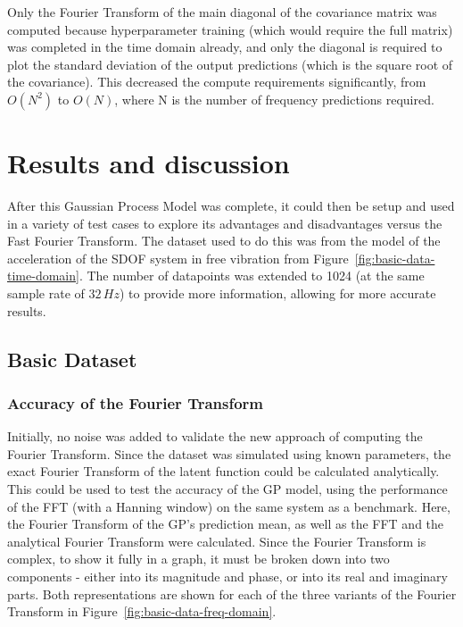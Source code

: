 \documentclass[12pt]{article}
\begin{document}

    Only the Fourier Transform of the main diagonal of the covariance matrix was computed because hyperparameter training (which would require the full matrix) was completed in the time domain already, and only the diagonal is required to plot the standard deviation of the output predictions (which is the square root of the covariance).
    This decreased the compute requirements significantly, from $O(N^2)$ to $O(N)$, where N is the number of frequency predictions required.



    \section{Results and discussion}
    After this Gaussian Process Model was complete, it could then be setup and used in a variety of test cases to explore its advantages and disadvantages versus the Fast Fourier Transform.
    The dataset used to do this was from the model of the acceleration of the SDOF system in free vibration from Figure~\ref{fig:basic-data-time-domain}.
    The number of datapoints was extended to 1024 (at the same sample rate of $32 \, Hz$) to provide more information, allowing for more accurate results.

    \subsection{Basic Dataset}
    \subsubsection{Accuracy of the Fourier Transform} \label{Acc}
    Initially, no noise was added to validate the new approach of computing the Fourier Transform.
    Since the dataset was simulated using known parameters, the exact Fourier Transform of the latent function could be calculated analytically.
    This could be used to test the accuracy of the GP model, using the performance of the FFT (with a Hanning window) on the same system as a benchmark.
    Here, the Fourier Transform of the GP's prediction mean, as well as the FFT and the analytical Fourier Transform were calculated.
    Since the Fourier Transform is complex, to show it fully in a graph, it must be broken down into two components - either into its magnitude and phase, or into its real and imaginary parts.
    Both representations are shown for each of the three variants of the Fourier Transform in Figure~\ref{fig:basic-data-freq-domain}.
\end{document}
